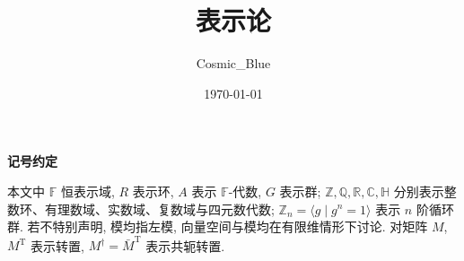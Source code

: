 \documentclass[12pt,a4paper]{ctexart}
\title{表示论}
\author{Cosmic\_Blue}
\date{\today}
\begin{document}
\maketitle
\thispagestyle{empty}

\newpage
{}
\begin{center}
  {\heiti\bfseries\large 记号约定}
\end{center}
\vspace{0.6em}

\noindent 本文中 $\mathbb{F}$ 恒表示域, $R$ 表示环, $A$ 表示 $\mathbb{F}$-代数, $G$ 表示群;
$\mathbb{Z},\mathbb{Q},\mathbb{R},\mathbb{C},\mathbb{H}$ 分别表示整数环、有理数域、实数域、复数域与四元数代数;
$\mathbb{Z}_n=\langle g\mid g^n=1\rangle$ 表示 $n$ 阶循环群.
若不特别声明, 模均指左模, 向量空间与模均在有限维情形下讨论.
对矩阵 $M$, $M^{\mathrm{T}}$ 表示转置, $M^{\dagger}=\bar M^{\mathrm{T}}$ 表示共轭转置.

\newpage
{}
\begingroup
\linespread{0.94}\selectfont
\tableofcontents
\endgroup
\newpage
{}









\appendix

\end{document}
